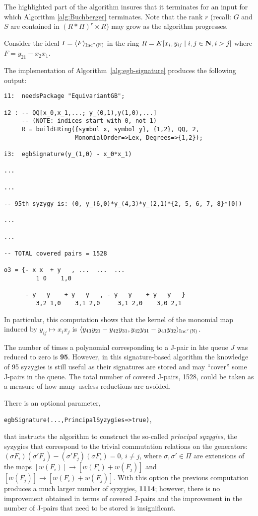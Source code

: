 The highlighted part of the algorithm insures that it terminates for an input for which Algorithm \ref{alg:Buchberger} terminates.
Note that the rank $r$ (recall: $G$ and $S$ are contained in $(R*\Pi)^r\times R$) may grow as the algorithm progresses. 

\begin{example}
Consider the ideal $I = \langle F \rangle_{\operatorname{Inc}^\tau(\mathbb N)}$ in the ring $R=K[x_i, y_{ij}\mid i,j\in\mathbf N, i>j]$ where $F = y_{21}-x_2x_1$.

The implementation of Algorithm~\ref{alg:egb-signature} produces the following output:
\begin{M2}
\begin{verbatim}
i1:  needsPackage "EquivariantGB";

i2 : -- QQ[x_0,x_1,...; y_(0,1),y(1,0),...] 
     -- (NOTE: indices start with 0, not 1)
     R = buildERing({symbol x, symbol y}, {1,2}, QQ, 2, 
                    MonomialOrder=>Lex, Degrees=>{1,2});

i3:  egbSignature(y_(1,0) - x_0*x_1)

...

...

-- 95th syzygy is: (0, y_(6,0)*y_(4,3)*y_(2,1)*{2, 5, 6, 7, 8}*[0])

...

...

-- TOTAL covered pairs = 1528
                     
o3 = {- x x  + y   , ...  ...  ...
         1 0    1,0  

      - y   y    + y   y   , - y   y    + y   y   }
         3,2 1,0    3,1 2,0     3,1 2,0    3,0 2,1
\end{verbatim}
\end{M2}  
\medskip

In particular, this computation shows that the kernel of the monomial map induced by $y_{ij}\mapsto x_ix_j$ is 
$\langle y_{43}y_{21}-y_{42}y_{31},y_{42}y_{31}-y_{41}y_{32} \rangle_{\operatorname{Inc}^\tau(\mathbb N)}$.

The number of times a polynomial corresponding to a J-pair in hte queue $J$ was reduced to zero is {\bf 95}. However, in this signature-based algorithm the knowledge of 95 syzygies is still useful as their signatures are stored and may ``cover'' some J-pairs in the queue. The total number of covered J-pairs, 1528, could be taken as a measure of how many useless reductions are avoided.

There is an optional parameter, \begin{center} \verb|egbSignature(...,PrincipalSyzygies=>true)|,\end{center} that instructs the algorithm to construct the so-called \emph{principal syzygies}, the syzygies that correspond to the trivial commutation relations on the generators: $(\sigma F_i) (\sigma' F_j)-(\sigma'F_j)(\sigma F_i)=0$, $i\neq j$, where $\sigma,\sigma'\in\Pi$ are extensions of the maps $[w(F_i)] \to [w(F_i) + w(F_j)]$ and $ [w(F_j)] \to [w(F_i) + w(F_j)]$.
With this option the previous computation produces a much larger number of syzygies, {\bf 1114}; however, there is no improvement obtained in terms of covered J-pairs and the improvement in the number of J-pairs that need to be stored is insignificant. 


\end{example}
